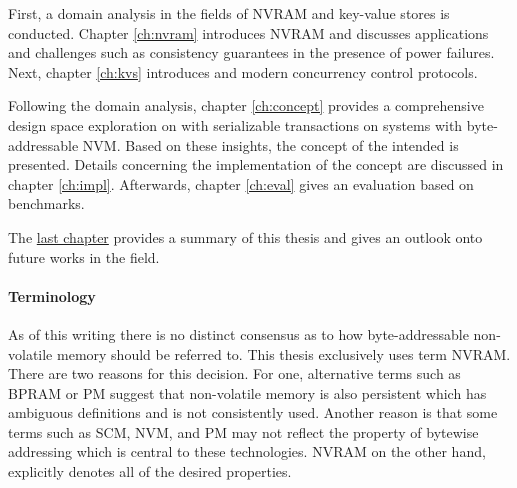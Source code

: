 First, a domain analysis in the fields of \ac{NVRAM} and key-value stores is
conducted. Chapter \ref{ch:nvram} introduces \ac{NVRAM} and discusses
applications and challenges such as consistency guarantees in the presence of
power failures. Next, chapter \ref{ch:kvs} introduces \kvsp and modern
concurrency control protocols.

Following the domain analysis, chapter \ref{ch:concept} provides a comprehensive
design space exploration on \kvsp with serializable transactions on systems with
byte-addressable \ac{NVM}. Based on these insights, the concept of the intended
\kvs is presented. Details concerning the implementation of the concept are
discussed in chapter \ref{ch:impl}. Afterwards, chapter \ref{ch:eval} gives an
evaluation based on benchmarks.

The \hyperref[ch:summary]{last chapter} provides a summary of this thesis and
gives an outlook onto future works in the field.

\paragraph{Terminology}

As of this writing there is no distinct consensus as to how byte-addressable
non-volatile memory should be referred to. This thesis exclusively uses term
NVRAM. There are two reasons for this decision. For one, alternative terms such
as BPRAM or PM suggest that non-volatile memory is also persistent which has
ambiguous definitions and is not consistently used. Another reason is that some
terms such as SCM, NVM, and PM may not reflect the property of bytewise
addressing which is central to these technologies. NVRAM on the other hand,
explicitly denotes all of the desired properties.
